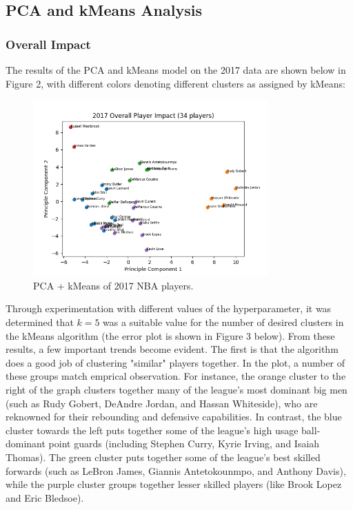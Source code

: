 \documentclass{article}
\begin{document}
\subsection{PCA and kMeans Analysis}

\subsubsection{Overall Impact}

The results of the PCA and kMeans model on the 2017 data are shown below in Figure 2, with different colors denoting different clusters as assigned by kMeans:

\begin{figure}[h]
  \centering
  \includegraphics[width=9cm]{2017_Graphs/PCA_Overall_2017.png}
  \caption{PCA + kMeans of 2017 NBA players.}
\end{figure}

Through experimentation with different values of the hyperparameter, it was determined that $k=5$ was a suitable value for the number of desired clusters in the kMeans algorithm (the error plot is shown in Figure 3 below). From these results, a few important trends become evident. The first is that the algorithm does a good job of clustering "similar" players together. In the plot, a number of these groups match emprical observation. For instance, the orange cluster to the right of the graph clusters together many of the league's most dominant big men (such as Rudy Gobert, DeAndre Jordan, and Hassan Whiteside), who are reknowned for their rebounding and defensive capabilities. In contrast, the blue cluster towards the left puts together some of the league's high usage ball-dominant point guards (including Stephen Curry, Kyrie Irving, and Isaiah Thomas). The green cluster puts together some of the league's best skilled forwards (such as LeBron James, Giannis Antetokounmpo, and Anthony Davis), while the purple cluster groups together lesser skilled players (like Brook Lopez and Eric Bledsoe). 
\end{document}
